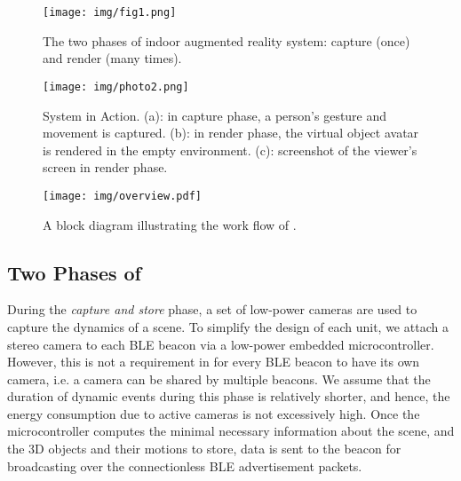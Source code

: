 \begin{figure}[!thb]
	\begin{center}
		\texttt{[image: img/fig1.png]}
		\caption{The two phases of \Sys indoor augmented reality system: capture (once) and render (many times).}
		\label{fig:beacons}
	\end{center}
	\vspace{-1em}
\end{figure}

\begin{figure*}[!htb]
	\begin{center}
		\texttt{[image: img/photo2.png]}
		\caption{System in Action. (a): in capture phase, a person's gesture and movement is captured. (b): in render phase, the virtual object avatar is rendered in the empty environment. (c): screenshot of the viewer's screen in render phase.}
		\label{fig:run_pi}
	\end{center}
\end{figure*}

\begin{figure*}[!htb]
	\begin{center}
		\texttt{[image: img/overview.pdf]}
		\caption{A block diagram illustrating the work flow of \Sys.}
		\label{fig:overview}
	\end{center}
	\vspace{-1.5em}
\end{figure*}

\subsection{Two Phases of \Sys}

During the \emph{capture and store} phase, a set of low-power cameras are used to capture the dynamics of a scene. To simplify the design of each unit, we attach a stereo camera to each BLE beacon via a low-power embedded microcontroller. However, this is not a requirement in \Sys for every BLE beacon to have its own camera, i.e. a camera can be shared by multiple beacons. We assume that the duration of dynamic events during this phase is relatively shorter, and hence, the energy consumption due to active cameras is not excessively high. Once the microcontroller computes the minimal necessary information about the scene, and the 3D objects and their motions to store, data is sent to the beacon for broadcasting over the connectionless BLE advertisement packets.

